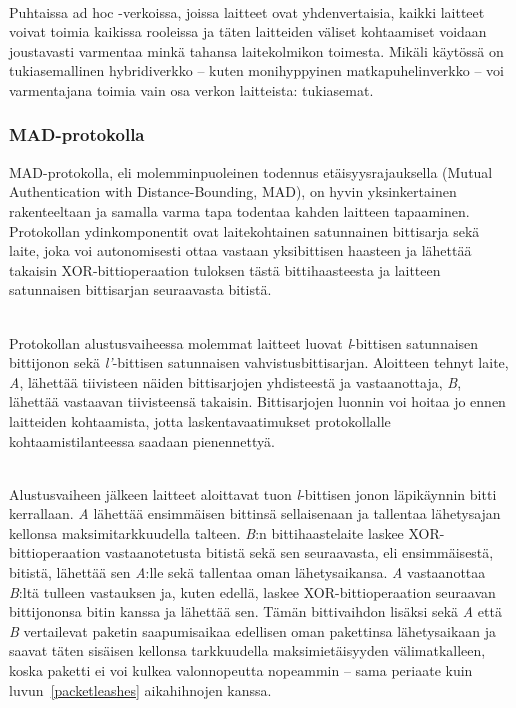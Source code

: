 \documentclass[finnish]{tktltiki2}
\theoremstyle{definition}
\theoremstyle{remark}
\begin{document}
\noindent\\
Puhtaissa ad hoc -verkoissa, joissa laitteet ovat yhdenvertaisia, kaikki laitteet voivat toimia kaikissa rooleissa ja täten laitteiden väliset kohtaamiset voidaan joustavasti varmentaa minkä tahansa laitekolmikon toimesta. Mikäli käytössä on tukiasemallinen hybridiverkko -- kuten monihyppyinen matkapuhelinverkko -- voi varmentajana toimia vain osa verkon laitteista: tukiasemat.

\subsubsection{MAD-protokolla}

MAD-protokolla, eli molemminpuoleinen todennus etäisyysrajauksella (Mutual Authentication with Distance-Bounding, MAD), on hyvin yksinkertainen rakenteeltaan ja samalla varma tapa todentaa kahden laitteen tapaaminen. Protokollan ydinkomponentit ovat laitekohtainen satunnainen bittisarja sekä laite, joka voi autonomisesti ottaa vastaan yksibittisen haasteen ja lähettää takaisin XOR-bittioperaation tuloksen tästä bittihaasteesta ja laitteen satunnaisen bittisarjan seuraavasta bitistä.

\noindent\\
Protokollan alustusvaiheessa molemmat laitteet luovat \emph{l}-bittisen satunnaisen bittijonon sekä \emph{l'}-bittisen satunnaisen vahvistusbittisarjan. Aloitteen tehnyt laite, \emph{A}, lähettää tiivisteen näiden bittisarjojen yhdisteestä ja vastaanottaja, \emph{B}, lähettää vastaavan tiivisteensä takaisin. Bittisarjojen luonnin voi hoitaa jo ennen laitteiden kohtaamista, jotta laskentavaatimukset protokollalle kohtaamistilanteessa saadaan pienennettyä.

\noindent\\
Alustusvaiheen jälkeen laitteet aloittavat tuon \emph{l}-bittisen jonon läpikäynnin bitti kerrallaan. \emph{A} lähettää ensimmäisen bittinsä sellaisenaan ja tallentaa lähetysajan kellonsa maksimitarkkuudella talteen. \emph{B}:n bittihaastelaite laskee XOR-bittioperaation vastaanotetusta bitistä sekä sen seuraavasta, eli ensimmäisestä, bitistä, lähettää sen \emph{A}:lle sekä tallentaa oman lähetysaikansa. \emph{A} vastaanottaa \emph{B}:ltä tulleen vastauksen ja, kuten edellä, laskee XOR-bittioperaation seuraavan bittijononsa bitin kanssa ja lähettää sen. Tämän bittivaihdon lisäksi sekä \emph{A} että \emph{B} vertailevat paketin saapumisaikaa edellisen oman pakettinsa lähetysaikaan ja saavat täten sisäisen kellonsa tarkkuudella maksimietäisyyden välimatkalleen, koska paketti ei voi kulkea valonnopeutta nopeammin -- sama periaate kuin luvun~\ref{packetleashes} aikahihnojen kanssa.
\end{document}
